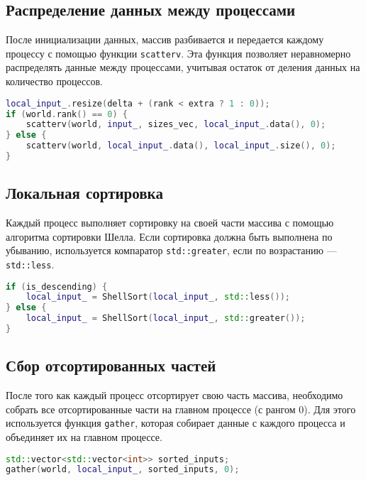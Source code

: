 \documentclass[a4paper,12pt]{article}
\begin{document}
\subsection{Распределение данных между процессами}
После инициализации данных, массив разбивается и передается каждому процессу с помощью функции \texttt{scatterv}. Эта функция позволяет неравномерно распределять данные между процессами, учитывая остаток от деления данных на количество процессов.

\begin{lstlisting}[language=C++,caption={Распределение данных между процессами}]
local_input_.resize(delta + (rank < extra ? 1 : 0)); 
if (world.rank() == 0) {
    scatterv(world, input_, sizes_vec, local_input_.data(), 0);
} else {
    scatterv(world, local_input_.data(), local_input_.size(), 0);
}
\end{lstlisting}

\subsection{Локальная сортировка}
Каждый процесс выполняет сортировку на своей части массива с помощью алгоритма сортировки Шелла. Если сортировка должна быть выполнена по убыванию, используется компаратор \texttt{std::greater}, если по возрастанию — \texttt{std::less}.

\begin{lstlisting}[language=C++,caption={Локальная сортировка}]
if (is_descending) {
    local_input_ = ShellSort(local_input_, std::less());
} else {
    local_input_ = ShellSort(local_input_, std::greater());
}
\end{lstlisting}

\subsection{Сбор отсортированных частей}
После того как каждый процесс отсортирует свою часть массива, необходимо собрать все отсортированные части на главном процессе (с рангом 0). Для этого используется функция  \texttt{gather}, которая собирает данные с каждого процесса и объединяет их на главном процессе.
\begin{lstlisting}[language=C++,caption={Сбор отсортированных частей}]
std::vector<std::vector<int>> sorted_inputs;
gather(world, local_input_, sorted_inputs, 0);

\end{lstlisting}
\end{document}
